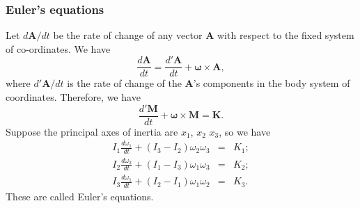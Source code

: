 \subsubsection{Euler's equations}
Let ${d\bm{A}}/{dt}$ be the rate of change of any vector $\bm{A}$ with respect to the fixed system of co-ordinates. We have
\[\frac{d\bm{A}}{dt} = \frac{d'\bm{A}}{dt} + \bm{\omega} \times \bm{A}, \]
where
${d'\bm{A}}/{dt}$ is the rate of change of the $\bm{A}$'s components in the body system of coordinates. Therefore, we have
\[\frac{d'\bm{M}}{dt} + \bm{\omega} \times \bm{M} = \bm{K}.\]
Suppose the principal axes of inertia are $x_1$, $x_2$ $x_3$, so we have
\begin{eqnarray}
I_1 \frac{d\omega_1}{dt} + (I_3-I_2)\omega_2\omega_3 &=& K_1 ;\nonumber \\
I_2 \frac{d\omega_2}{dt} + (I_1-I_3)\omega_1\omega_3 &=& K_2 ;\nonumber \\
I_3 \frac{d\omega_1}{dt} + (I_2-I_1)\omega_1\omega_2 &=& K_3 .\nonumber
\end{eqnarray}
These are called Euler's equations.

